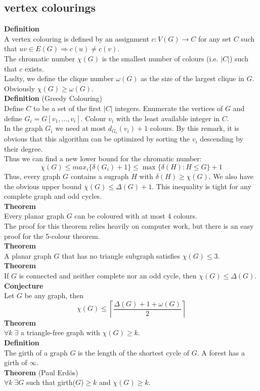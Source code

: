 \documentclass[a4paper, 12pt]{article}
\begin{document}
	\subsection{vertex colourings}
	\textbf{Definition}\\
	A vertex colouring is defined by an assignment $c: V(G) \to C$ for any set $C$ such that $uv \in E(G) \Rightarrow c(u) \neq c(v)$.\\
	The chromatic number $\chi(G)$ is the smallest number of colours (i.e. $\left|C\right|$) such that $c$ exists.\\
	Laslty, we define the clique number $\omega(G)$ as the size of the largest clique in $G$. Obviously $\chi(G) \geq \omega(G)$.\\
	\textbf{Definition} (Greedy Colouring)\\
	Define $C$ to be a set of the first $\left|C\right|$ integers. Enumerate the vertices of $G$ and define $G_i = G[v_1,...,v_i]$. Colour $v_i$ with the least available integer in $C$.\\
	In the graph $G_i$ we need at most $d_{G_i}(v_i) + 1$ colours. By this remark, it is obvious that this algorithm can be optimized by sorting the $v_i$ descending by their degree.\\
	Thus we can find a new lower bound for the chromatic number: \[\chi(G) \leq max_i\{\delta(G_i)+1\} \leq \max \{\delta(H): H\leq G\}+1\]
	Thus, every graph $G$ contains a sugraph $H$ with $\delta(H) \geq \chi(G)$. We also have the obvious upper bound $\chi(G) \leq \Delta(G)+1$. This inequality is tight for any complete graph and odd cycles.\\
	\textbf{Theorem}\\
	Every planar graph $G$ can be coloured with at most 4 colours.\\
	The proof for this theorem relies heavily on computer work, but there is an easy proof for the 5-colour theorem.\\
	\textbf{Theorem}\\
	A planar graph $G$ that has no triangle subgraph satisfies $\chi(G)\leq 3$.\\
	\textbf{Theorem}\\
	If $G$ is connected and neither complete nor an odd cycle, then $\chi(G) \leq \Delta(G)$.\\
	\textbf{Conjecture}\\
	Let $G$ be any graph, then \[\chi(G) \leq \left\lceil \frac{\Delta(G) + 1 + \omega(G)}{2} \right\rceil\]
	\textbf{Theorem}\\
	$\forall k \; \exists$ a triangle-free graph with $\chi(G) \geq k$.\\
	\textbf{Definition}\\
	The girth of a graph $G$ is the length of the shortest cycle of $G$. A forest has a girth of $\infty$.\\
	\textbf{Theorem} (Paul Erdös)\\
	$\forall k \; \exists G$ such that girth($G$)$\geq k$ and $\chi(G) \geq k$.
\end{document}

